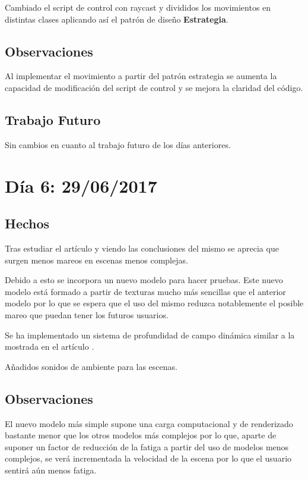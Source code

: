 \documentclass[12pt,a4paper]{article}
\begin{document}
Cambiado el script de control con raycast y divididos los movimientos en distintas clases aplicando así el patrón de diseño \textbf{Estrategia}.

\subsection{Observaciones}

Al implementar el movimiento a partir del patrón estrategia se aumenta la capacidad de modificación del script de control y se mejora la claridad del código.

\subsection{Trabajo Futuro}

Sin cambios en cuanto al trabajo futuro de los días anteriores.

\section{Día 6: 29/06/2017}

\subsection{Hechos}

Tras estudiar el artículo \cite{Davis et al.} y viendo las conclusiones del mismo se aprecia que surgen menos mareos en escenas menos complejas.

Debido a esto se incorpora un nuevo modelo para hacer pruebas. Este nuevo modelo está formado a partir de texturas mucho más sencillas que el anterior modelo por lo que se espera que el uso del mismo reduzca notablemente el posible mareo que puedan tener los futuros usuarios.

Se ha implementado un sistema de profundidad de campo dinámica similar a la mostrada en el artículo \cite{Carnegie and Rhee}.

Añadidos sonidos de ambiente para las escenas.

\subsection{Observaciones}

El nuevo modelo más simple supone una carga computacional y de renderizado bastante menor que los otros modelos más complejos por lo que, aparte de suponer un factor de reducción de la fatiga a partir del uso de modelos menos complejos, se verá incrementada la velocidad de la escena por lo que el usuario sentirá aún menos fatiga.
\end{document}
